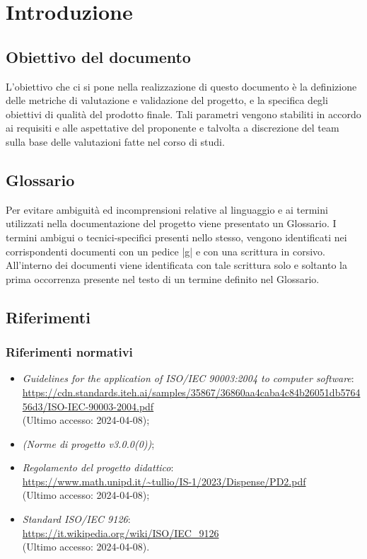\documentclass[10pt, a4paper]{article}
\title{\titolo}
\author{SWEetCode}
\begin{document}



\newpage

\tableofcontents
\newpage
\listoffigures
\newpage
\listoftables
\newpage

\section{Introduzione}
\subsection{Obiettivo del documento}
L'obiettivo che ci si pone nella realizzazione di questo documento è la definizione delle metriche di valutazione e validazione del progetto, e la specifica degli obiettivi di qualità del prodotto finale. Tali parametri vengono stabiliti in accordo ai requisiti e 
alle aspettative del proponente e talvolta a discrezione del team sulla base delle valutazioni fatte nel corso di studi.

\subsection{Glossario}
Per evitare ambiguità ed incomprensioni relative al linguaggio e ai termini utilizzati nella documentazione del progetto viene presentato un Glossario.
I termini ambigui o tecnici-specifici presenti nello stesso, vengono identificati nei corrispondenti documenti con un pedice |g| e con una scrittura in corsivo.
All'interno dei documenti viene identificata con tale scrittura solo e soltanto la prima occorrenza presente nel testo di un termine definito nel Glossario.

\subsection{Riferimenti}
   \subsubsection{Riferimenti normativi}
   \begin{itemize}
    \item \textit{Guidelines for the application of ISO/IEC 90003:2004 to computer software}: \\
        \url{https://cdn.standards.iteh.ai/samples/35867/36860aa4caba4c84b26051db576456d3/ISO-IEC-90003-2004.pdf}\\
        (Ultimo accesso: 2024-04-08);
    \item \textit{(Norme di progetto v3.0.0(0))};
    \item \textit{Regolamento del progetto didattico}: \\
        \url{https://www.math.unipd.it/~tullio/IS-1/2023/Dispense/PD2.pdf}\\
        (Ultimo accesso: 2024-04-08);
    \item \textit{Standard ISO/IEC 9126}:\\
        \url{https://it.wikipedia.org/wiki/ISO/IEC_9126}\\
        (Ultimo accesso: 2024-04-08).
    \end{itemize}
    
\end{document}

